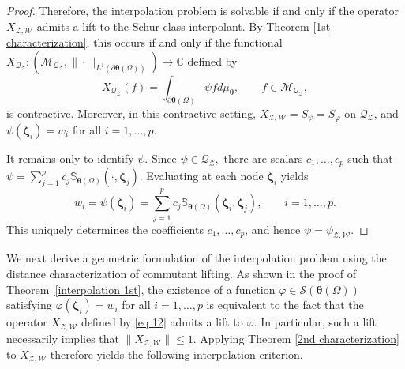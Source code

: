 \documentclass[12pt,reqno]{amsart}
\theoremstyle{remark}
\theoremstyle{definition}
\begin{document}
\begin{proof}
    Therefore, the interpolation problem is solvable if and only if the operator $X_{\mathcal{Z},\mathcal{W}}$ admits a lift to the Schur-class interpolant.
    By Theorem \ref{1st characterization}, this occurs if and only if the functional 
    $X_{\mathcal{Q}_{\mathcal{Z}}}: \left(\mathcal{M}_{\mathcal{Q}_{\mathcal{Z}}}, \|\cdot \|_{L^1(\partial\boldsymbol \theta(\Omega))}\right) \to \mathbb C$ defined by $$X_{\mathcal{Q}_{\mathcal{Z}}}(f)=\int_{\partial\boldsymbol \theta(\Omega)} \psi f d\mu_{\boldsymbol \theta}, \qquad f\in \mathcal{M}_{\mathcal{Q}_{\mathcal{Z}}},$$
    is contractive.
    Moreover, in this contractive setting, $X_{\mathcal{Z}, \mathcal{W}} = S_{\psi} = S_{\varphi}$ on $\mathcal{Q}_{\mathcal{Z}}$, and $\psi(\boldsymbol{\zeta}_i) = w_i$ for all $i = 1, \ldots, p.$
    
    It remains only to identify $\psi.$ Since $\psi\in \mathcal{Q}_{\mathcal{Z}},$ there are scalars $c_1,\ldots,c_p$ such that $\psi=\sum_{j=1}^p c_j \mathbb S_{\boldsymbol \theta(\Omega)}(\cdot, \boldsymbol \zeta_j).$ Evaluating at each node $\boldsymbol \zeta_i$ yields
    $$ w_i=\psi(\boldsymbol \zeta_i)= \sum_{j=1}^p c_j \mathbb S_{\boldsymbol \theta(\Omega)}(\boldsymbol \zeta_i, \boldsymbol \zeta_j),\qquad i=1,\ldots,p.$$
    This uniquely determines the coefficients $c_1,\ldots, c_p$, and hence  $\psi=\psi_{\mathcal{Z,W}}.$
    \end{proof}
    
We next derive a geometric formulation of the interpolation problem using the distance characterization of commutant lifting.
As shown in the proof of Theorem~\ref{interpolation 1st}, the existence of a function $\varphi \in \mathcal{S}(\boldsymbol \theta(\Omega))$ satisfying $\varphi(\boldsymbol \zeta_i)=w_i$ for all $i=1,\ldots, p$ 
 is equivalent to the fact that the operator $X_{\mathcal{Z,W}}$ defined by \eqref{eq 12} admits a lift to $\varphi.$ In particular, such a lift necessarily implies that $\|X_{\mathcal{Z,W}}\|\leq 1.$ Applying Theorem \ref{2nd characterization} to $X_{\mathcal{Z,W}}$ therefore yields the following interpolation criterion.
\end{document}
